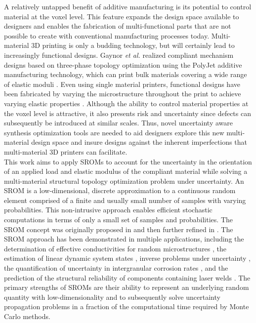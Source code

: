 A relatively untapped benefit of additive manufacturing is its potential to control material at the voxel level. This feature expands the design space available to designers and enables the fabrication of multi-functional parts that are not possible to create with conventional manufacturing processes today. Multi-material 3D printing is only a budding technology, but will certainly lead to increasingly functional designs. Gaynor \textit{et al.} \cite{gaynor2014multiple} realized compliant mechanism designs based on three-phase \cite{sigmund1997design,sigmund2001designPartOne,sigmund2001designPartTwo} topology optimization using the PolyJet additive manufacturing technology, which can print bulk materials covering a wide range of elastic moduli \cite{stratasys}. Even using single material printers, functional designs have been fabricated by varying the microstructure throughout the print to achieve varying elastic properties \cite{schumacher2015microstructures}. Although the ability to control material properties at the voxel level is attractive, it also presents risk and uncertainty since defects can subsequently be introduced at similar scales. Thus, novel uncertainty aware synthesis optimization tools are needed to aid designers explore this new multi-material design space and insure designs against the inherent imperfections that multi-material 3D printers can facilitate. \\

This work aims to apply SROMs to account for the uncertainty in the orientation of an applied load and elastic modulus of the compliant material while solving a multi-material structural topology optimization problem under uncertainty. An SROM is a low-dimensional, discrete approximation to a continuous random element comprised of a finite and usually small number of samples with varying probabilities. This non-intrusive approach enables efficient stochastic computations in terms of only a small set of samples and probabilities. The SROM concept was originally proposed in \cite{grigoriu2009reduced} and then further refined in \cite{warner2013stochastic}. The SROM approach has been demonstrated in multiple applications, including the determination of effective conductivities for random microstructures \cite{grigoriu2010effective}, the estimation of linear dynamic system states \cite{grigoriu2010linear,grigoriu2013solution}, inverse problems under uncertainty \cite{warner2015stochastic}, the quantification of uncertainty in intergranular corrosion rates \cite{sarkar2014stochastic}, and the prediction of the structural reliability of components containing laser welds \cite{emery2015predicting}. The primary strengths of SROMs are their ability to represent an underlying random quantity with low-dimensionality and to subsequently solve uncertainty propagation problems in a fraction of the computational time required by Monte Carlo methods.\\

